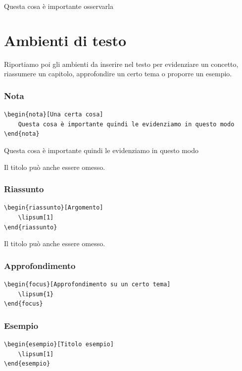 \documentclass{classnotes}
\begin{document}
\begin{oss}
    Questa cosa è importante osservarla
\end{oss}


\section{Ambienti di testo}
Riportiamo poi gli ambienti da inserire nel testo per evidenziare un concetto, riassumere un capitolo, approfondire un certo tema o proporre un esempio.

\subsubsection*{Nota}
\begin{verbatim}
\begin{nota}[Una certa cosa]
    Questa cosa è importante quindi le evidenziamo in questo modo
\end{nota}
\end{verbatim}
\begin{nota}
    Questa cosa è importante quindi le evidenziamo in questo modo
\end{nota}
Il titolo può anche essere omesso.


\subsubsection*{Riassunto}
\begin{verbatim}
\begin{riassunto}[Argomento]
    \lipsum[1]
\end{riassunto}    
\end{verbatim}
\begin{riassunto}[Argomento]
    \lipsum[1]
\end{riassunto}
Il titolo può anche essere omesso.

\subsubsection*{Approfondimento}
\begin{verbatim}
\begin{focus}[Approfondimento su un certo tema]
    \lipsum{1}
\end{focus}    
\end{verbatim}
\begin{focus}
    \lipsum[1]
\end{focus}


\subsubsection*{Esempio}
\begin{verbatim}
\begin{esempio}[Titolo esempio]
    \lipsum[1]
\end{esempio}    
\end{verbatim}
\begin{esempio}
    \lipsum[1]
\end{esempio}
\end{document}
